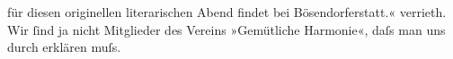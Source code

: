 \begin{ledgroupsized}[t]{13cm}
{{{                        für diesen originellen literarischen Abend findet bei Bösendorferstatt.«}}}\label{K_L00658_5h} verrieth. Wir ſind
                  ja nicht Mitglieder des Vereins »Gemütliche
                     Harmonie«, daſs man uns durch \label{K_L00658_6v}\label{K_L00658_6h} erklären
                  muſs.\pend
                     \endnumbering{}\end{ledgroupsized}  \newcommand{\dateiname}{L00658}\newcommand{\titel}{Arthur Schnitzler an Hermann Bahr, 23. 3. 1897}\newcommand{\editorInnen}{ Kurt Ifkovits,  Martin Anton Müller}
            \footnotesize
\begin{ledgroupsized}[t]{11.5cm}
\end{ledgroupsized}
         
      